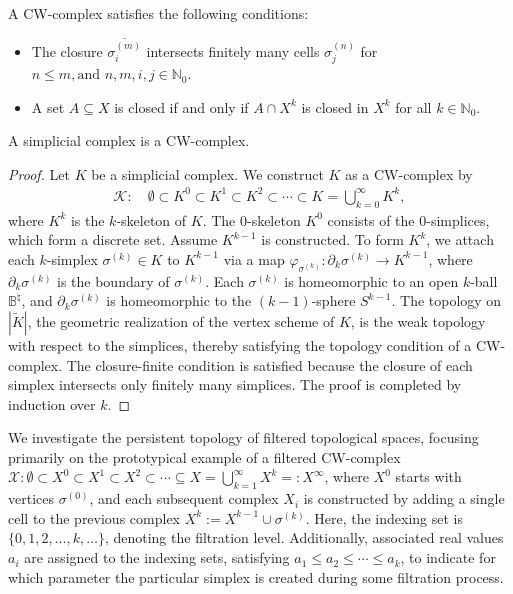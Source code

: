 \begin{remark}
A CW-complex satisfies the following conditions:
\begin{itemize}
    \item The closure \(\overline{\sigma^{(m)}_i}\) intersects finitely many cells \(\sigma^{(n)}_j\) for \(n \leq m, \text{and } n,m,i,j \in \mathbb{N}_0\).
    \item A set \(A \subseteq X\) is closed if and only if \(A \cap X^k\) is closed in \(X^k\) for all \(k \in \mathbb{N}_0\).
\end{itemize}
\end{remark}

\begin{proposition}
A simplicial complex is a CW-complex.
\end{proposition}

\begin{proof}
Let \(K\) be a simplicial complex. We construct \(K\) as a CW-complex by
\begin{align}
\mathcal{K}: \quad \emptyset \subset K^0 \subset K^1 \subset K^2 \subset \cdots \subset K = \bigcup_{k=0}^{\infty} K^k,
\end{align}
where \(K^k\) is the \(k\)-skeleton of \(K\). The $0$-skeleton \(K^0\) consists of the $0$-simplices, which form a discrete set. Assume \(K^{k-1}\) is constructed. To form \(K^k\), we attach each \(k\)-simplex \(\sigma^{(k)} \in K\) to \(K^{k-1}\) via a map \(\varphi_{\sigma^{(k)}} : \partial_{k} \sigma^{(k)} \to K^{k-1}\), where \(\partial_{k} \sigma^{(k)}\) is the boundary of \(\sigma^{(k)}\). Each \(\sigma^{(k)}\) is homeomorphic to an open \(k\)-ball \(\mathbb{B}^{\natural}\), and \(\partial_{k} \sigma^{(k)}\) is homeomorphic to the \((k-1)\)-sphere \(S^{k-1}\). The topology on \(|\tilde{K}|\), the geometric realization of the vertex scheme of \(K\), is the weak topology with respect to the simplices, thereby satisfying the topology condition of a CW-complex. The closure-finite condition is satisfied because the closure of each simplex intersects only finitely many simplices. The proof is completed by induction over $k$.
\end{proof}

We investigate the persistent topology of filtered topological spaces, focusing primarily on the prototypical example of a filtered CW-complex $\mathcal{X}: \emptyset \subset X^{0} \subset X^{1} \subset X^{2} \subset \cdots \subseteq X = \bigcup_{k=1}^{\infty} X^{k} =: X^\infty$, where \(X^{0}\) starts with vertices \(\sigma^{(0)}\), and each subsequent complex \(X_{i}\) is constructed by adding a single cell to the previous complex $X^{k} := X^{k-1} \cup \sigma^{(k)}$. Here, the indexing set is \(\{0, 1, 2, \ldots, k, \ldots\}\), denoting the filtration level. Additionally, associated real values \(a_{i}\) are assigned to the indexing sets, satisfying \(a_{1} \leq a_{2} \leq \cdots \leq a_{k}\), to indicate for which parameter the particular simplex is created during some filtration process.

